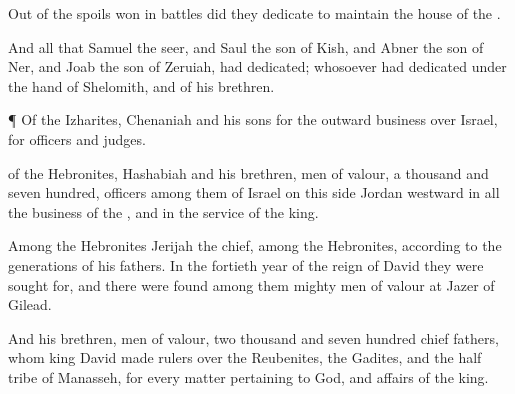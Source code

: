 {Out of the
spoils won in
battles did they
dedicate to
maintain the
house of the
{}.

And all that
Samuel the
seer, and
Saul the
son of
Kish, and
Abner the
son of
Ner, and
Joab the
son of
Zeruiah, had
dedicated;
{} whosoever had
dedicated
{} under the
hand of
Shelomith, and of his
brethren.


\par }{\PP {}¶ Of the
Izharites,
Chenaniah and his
sons
{} for the
outward
business over
Israel, for
officers and
judges.

 of the
Hebronites,
Hashabiah and his
brethren,
men of
valour, a
thousand and
seven
hundred,
{}
officers among them of
Israel on this
side
Jordan
westward in all the
business of the
{}, and in the
service of the
king.

Among the
Hebronites
{}
Jerijah the
chief,
{} among the
Hebronites, according to the
generations of his
fathers. In the
fortieth
year of the
reign of
David they were
sought for, and there were
found among them mighty
men of
valour at
Jazer of
Gilead.

And his
brethren,
men of
valour,
{} two
thousand and
seven
hundred
chief
fathers, whom
king
David made
rulers over the
Reubenites, the
Gadites, and the
half
tribe of
Manasseh, for every
matter pertaining to
God, and
affairs of the
king.




\par }
